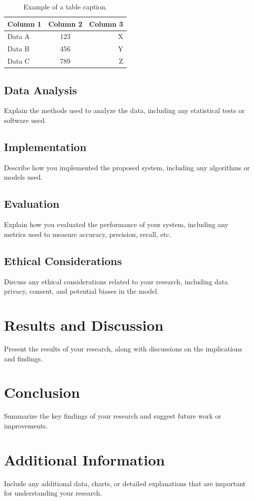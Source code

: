 \documentclass[12pt]{report}
\begin{document}
\begin{table}[htbp]
  \centering
  \caption{Example of a table caption.}
  \label{tab:example2}
  \begin{tabular}{lcr}
    \toprule
    Column 1 & Column 2 & Column 3 \\
    \midrule
    Data A   & 123      & X \\
    Data B   & 456      & Y \\
    Data C   & 789      & Z \\
    \bottomrule
  \end{tabular}
\end{table}

\section{Data Analysis}
Explain the methods used to analyze the data, including any statistical tests or software used.
\section{Implementation}
Describe how you implemented the proposed system, including any algorithms or models used.
\section{Evaluation}
Explain how you evaluated the performance of your system, including any metrics used to measure accuracy, precision, recall, etc.
\section{Ethical Considerations}
Discuss any ethical considerations related to your research, including data privacy, consent, and potential biases in the model.

\newpage
\chapter{Results and Discussion}
Present the results of your research, along with discussions on the implications and findings.

\chapter{Conclusion}
Summarize the key findings of your research and suggest future work or improvements.

\newpage
\sloppy
\printbibliography
\newpage

\appendix
\chapter{Additional Information}
Include any additional data, charts, or detailed explanations that are important for understanding your research.
\end{document}
